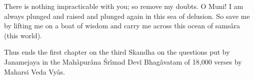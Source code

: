 There is nothing impracticable with you; so remove my doubts. O Muni! I am always plunged and raised and plunged again in this sea of delusion. So save me by lifting me on a boat of wisdom and carry me across this ocean of sams\^ara (this world).

Thus ends the first chapter on the third Skandha on the questions put by Janamejaya in the Mah\^apur\^ana \'Sr\^imad Dev\^i Bhag\^avatam of 18,000 verses by Maharsi Veda Vy\^as.